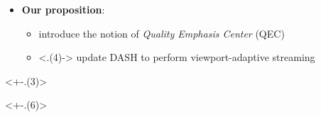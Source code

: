 \begin{frame}[c]
{\begin{columns}[T]
         \begin{column}{0.5\linewidth}
         \end{column}
         \begin{column}{0.5\linewidth}
         \end{column}
      \end{columns}
   }
   \begin{itemize}[<+->]
      \item \textbf{Our proposition}:
      \begin{itemize}[<.->]
         \item introduce the notion of \emph{Quality Emphasis Center} (QEC)
         \item<.(4)-> update DASH to perform viewport-adaptive streaming
      \end{itemize}
   \end{itemize}

   \begin{minipage}[t][7cm][t]{\textwidth}
      \only<+-.(3)> {
      \begin{independentCounter}
         
      \end{independentCounter}
      }
      \only<+-.(6)> {
         \begin{independentCounter}
            
         \end{independentCounter}
      }
   \end{minipage}

\end{frame}

